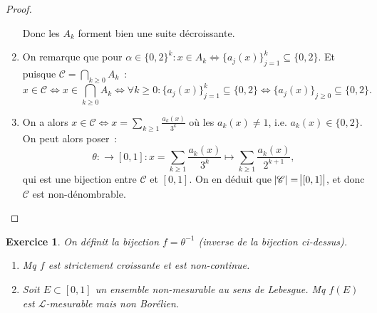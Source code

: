 \documentclass{article}
\newtheorem{ex}{Exercice}[section]
\theoremstyle{definition}
\begin{document}
\begin{proof}
\begin{enumerate}
	Donc les $A_k$ forment bien une suite décroissante.

	\item On remarque que pour $\alpha \in \{0, 2\}^k : x \in A_k \iff \{a_j(x)\}_{j=1}^k \subseteq \{0, 2\}$. Et puisque $\mathscr C = \bigcap_{k \geq 0}A_k$~:
	\[x \in \mathscr C \iff x \in \bigcap_{k \geq 0}A_k \iff \forall k \geq 0 : \{a_j(x)\}_{j=1}^k \subseteq \{0, 2\} \iff \{a_j(x)\}_{j \geq 0} \subseteq \{0, 2\}.\]

	\item On a alors $x \in \mathscr C \iff x = \sum_{k \geq 1}\frac {a_k(x)}{3^k}$ où les $a_k(x) \neq 1$, i.e. $a_k(x) \in \{0, 2\}$. On peut alors poser~:
	\[\theta : \mathscr \to [0, 1] : x = \sum_{k \geq 1}\frac {a_k(x)}{3^k} \mapsto \sum_{k \geq 1}\frac {a_k(x)}{2^{k+1}},\]
	qui est une bijection entre $\mathscr C$ et $[0, 1]$. On en déduit que $\abs {\mathscr C} = \abs {[0, 1]}$, et donc $\mathscr C$ est non-dénombrable.
\end{enumerate}
\end{proof}

\begin{ex} On définit la bijection $f = \theta^{-1}$ (inverse de la bijection ci-dessus).
\begin{enumerate}
	\item Mq $f$ est strictement croissante et est non-continue.
	\item Soit $E \subset [0, 1]$ un ensemble non-mesurable au sens de Lebesgue. Mq $f(E)$ est $\mathcal L$-mesurable mais non Borélien.
\end{enumerate}
\end{ex}
\end{document}
